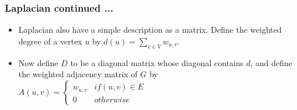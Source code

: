 \documentclass[10pt,sans,serif,trans]{beamer}
\begin{document}
\begin{frame}
\frametitle{Laplacian continued ...}
\begin{itemize}
\item  Laplacian also have a simple description as a matrix. Define the
weighted degree of a vertex $u$ by $d(u) = \sum_{v \in V}w_{u,v}.$
\item  Now define $D$ to be a diagonal matrix whose diagonal contains $d$, and
define the weighted adjacency matrix of $G$ by \\
$A(u,v) =
\begin{cases}
  w_{u,v} & \textit{if} (u,v) \in E \\
  0  & otherwise
\end{cases}
$
\end{itemize}
\end{frame}
\end{document}
